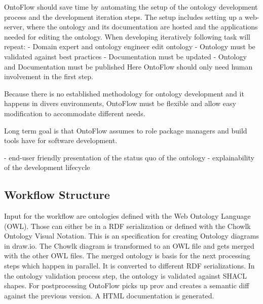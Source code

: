 \documentclass[sigconf]{acmart}
\begin{document}
OntoFlow should save time by automating the setup of the ontology development process and the development iteration steps.
The setup includes setting up a web-server, where the ontology and its documentation are hosted and the applications needed for editing the ontology.
When developing iteratively following task will repeat:
  - Domain expert and ontology engineer edit ontology
  - Ontology must be validated against best practices
  - Documentation must be updated
  - Ontology and Documentation must be published
Here OntoFlow should only need human involvement in the first step.

Because there is no established methodology for ontology development and it happens in divers environments, OntoFlow must be flexible and allow easy modification to accommodate different needs.

Long term goal is that OntoFlow assumes to role package managers and build tools have for software development.\todo{}

- end-user friendly presentation of the status quo of the ontology
- explainability of the development lifecycle

\subsection{Workflow Structure}

Input for the workflow are ontologies defined with the Web Ontology Language (OWL). Those can either be in a RDF serialization or defined with the Chowlk Ontology Visual Notation. This is an specification for creating Ontology diagrams in draw.io.
The Chowlk diagram is transformed to an OWL file and gets merged with the other OWL files.
The merged ontology is basis for the next processing steps which happen in parallel.
It is converted to different RDF serializations.
In the ontology validation process step, the ontology is validated against SHACL shapes.
For postprocessing OntoFlow picks up prov\todo{} and creates a semantic diff against the previous version.
A HTML documentation is generated.
\end{document}
